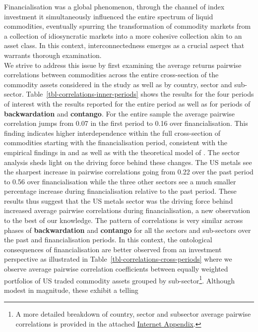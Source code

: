 \documentclass[
  authoryear,
  preprint,
  3p]{elsarticle}
\begin{document}
\medskip

Financialisation was a global phenomenon, through the channel of index
investment it simultaneously influenced the entire spectrum of liquid
commodities, eventually spurring the transformation of commodity markets
from a collection of idiosyncratic markets into a more cohesive
collection akin to an asset class. In this context, interconnectedness
emerges as a crucial aspect that warrants thorough examination.\\
We strive to address this issue by first examining the average returns
pairwise correlations between commodities across the entire
cross-section of the commodity assets considered in the study as well as
by country, sector and sub-sector.
Table~\ref{tbl-correlations-inner-periods} shows the results for the
four periods of interest with the results reported for the entire period
as well as for periods of \textbf{backwardation} and \textbf{contango}.
For the entire sample the average pairwise correlation jumps from 0.07
in the first period to 0.16 over financialisation. This finding
indicates higher interdependence within the full cross-section of
commodities starting with the financialisation period, consistent with
the empirical findings in \citet{fryMcKibbin_evolution_2023} and
\citet{mayer_financialization_2017} as well as with the theoretical
model of \citet{basak_model_2016}. The sector analysis sheds light on
the driving force behind these changes. The US metals see the sharpest
increase in pairwise correlations going from 0.22 over the past period
to 0.56 over financialisation while the three other sectors see a much
smaller percentage increase during financialisation relative to the past
period. These results thus suggest that the US metals sector was the
driving force behind increased average pairwise correlations during
financialisation, a new observation to the best of our knowledge. The
pattern of correlations is very similar across phases of
\textbf{backwardation} and \textbf{contango} for all the sectors and
sub-sectors over the past and financialisation periods. In this context,
the ontological consequences of financialisation are better observed
from an investment perspective as illustrated in
Table~\ref{tbl-correlations-cross-periods} where we observe average
pairwise correlation coefficients between equally weighted portfolios of
US traded commodity assets grouped by sub-sector\footnote{A more
  detailed breakdown of country, sector and subsector average pairwise
  correlations is provided in the attached
  \href{http://bautheac.duckdns.org:3838/bautheac/co-movement/}{Internet
  Appendix}.}. Although modest in magnitude, these exhibit a telling
\end{document}
